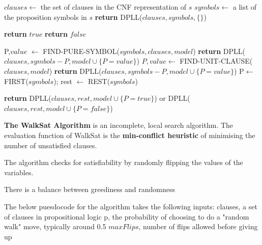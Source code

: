 \documentclass{article}
\begin{document}
\begin{algorithm}
\begin{algorithmic}

    \State $clauses \leftarrow$ the set of clauses in the CNF representation of $s$ 
    \State $symbols \leftarrow$ a list of the proposition symbols in $s$
    \State \textbf{return} DPLL($clauses,symbols,\{\}$) 
\EndProcedure \newline

 

        \State \textbf{return} $true$
    \EndIf
        \State \textbf{return} $false$
    \EndIf

    \State P,$value$ $\leftarrow$ FIND-PURE-SYMBOL($symbols,clauses,model$)
        \State \textbf{return} DPLL($clauses,symbols -P, model \cup \{P=value\}$)
    \EndIf
    \State $P,value \leftarrow$ FIND-UNIT-CLAUSE($clauses,model$)
        \State \textbf{return} DPLL($clauses,symbols-P,model \cup \{P = value\}$)
    \EndIf
    \State P$\leftarrow$ FIRST($symbols$); rest $\leftarrow$ REST($symbols$)

    \State \textbf{return} DPLL($clauses,rest,model \cup \{P=true\}$) or DPLL($clauses,rest,model \cup \{P=false\}$)

\EndProcedure

\end{algorithmic}
\end{algorithm}

\textbf{The WalkSat Algorithm} is an incomplete, local search algorithm. The evaluation function of WalkSat is the \textbf{min-conflict heuristic} of minimising the number of unsatisfied clauses.

The algorithm checks for satisfiability by randomly flipping the values of the variables. 

There is a balance between greediness and randomness \newline 

The below puesdocode for the algorithm takes the following inputs:
clauses, a set of clauses in propositional logic
p, the probability of choosing to do a "random walk" move, typically around 0.5
$maxFlips$, number of flips allowed before giving up \newline
\end{document}
